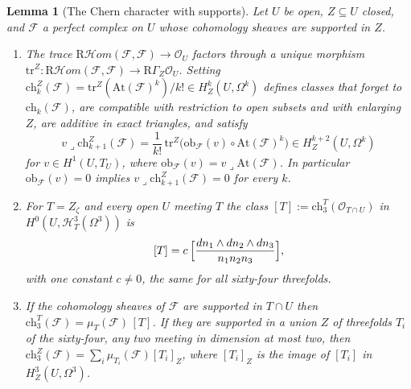 \documentclass[11pt,reqno]{amsart}
\numberwithin{equation}{section}
\theoremstyle{plain}
\newtheorem{lemma}[theorem]{Lemma}
\theoremstyle{definition}
\newcommand{\ch}{\mathrm{ch}}
\begin{document}
\begin{lemma}[The Chern character with supports]\label{lem:chsupport}
Let $U$ be open, $Z\subseteq U$ closed, and $\mathcal{F}$ a perfect complex on $U$ whose cohomology sheaves are supported in $Z$.
\begin{enumerate}
\item[(i)] The trace $\mathrm{R}\mathcal{H}om(\mathcal{F},\mathcal{F})\to\mathcal{O}_{U}$ factors through a unique morphism $\mathrm{tr}^{Z}\colon\mathrm{R}\mathcal{H}om(\mathcal{F},\mathcal{F})\to\mathrm{R}\Gamma_{Z}\mathcal{O}_{U}$. Setting $\ch^{Z}_{k}(\mathcal{F})=\mathrm{tr}^{Z}(\mathrm{At}(\mathcal{F})^{k})/k!\in H^{k}_{Z}(U,\Omega^{k})$ defines classes that forget to $\ch_{k}(\mathcal{F})$, are compatible with restriction to open subsets and with enlarging $Z$, are additive in exact triangles, and satisfy
\[
v\lrcorner\ch^{Z}_{k+1}(\mathcal{F})=\frac{1}{k!}\,\mathrm{tr}^{Z}\bigl(\mathrm{ob}_{\mathcal{F}}(v)\circ\mathrm{At}(\mathcal{F})^{k}\bigr)\in H^{k+2}_{Z}(U,\Omega^{k})
\]
for $v\in H^{1}(U,T_{U})$, where $\mathrm{ob}_{\mathcal{F}}(v)=v\lrcorner\mathrm{At}(\mathcal{F})$. In particular $\mathrm{ob}_{\mathcal{F}}(v)=0$ implies $v\lrcorner\ch^{Z}_{k+1}(\mathcal{F})=0$ for every $k$.
\item[(ii)] For $T=Z_{\zeta}$ and every open $U$ meeting $T$ the class $[T]:=\ch^{T}_{3}(\mathcal{O}_{T\cap U})$ in $H^{0}(U,\mathcal{H}^{3}_{T}(\Omega^{3}))$ is
\[
[T]=c\,\Bigl[\frac{dn_{1}\wedge dn_{2}\wedge dn_{3}}{n_{1}n_{2}n_{3}}\Bigr],
\]
with one constant $c\ne0$, the same for all sixty-four threefolds.
\item[(iii)] If the cohomology sheaves of $\mathcal{F}$ are supported in $T\cap U$ then $\ch^{T}_{3}(\mathcal{F})=\mu_{T}(\mathcal{F})\,[T]$. If they are supported in a union $Z$ of threefolds $T_{i}$ of the sixty-four, any two meeting in dimension at most two, then $\ch^{Z}_{3}(\mathcal{F})=\sum_{i}\mu_{T_{i}}(\mathcal{F})[T_{i}]_{Z}$, where $[T_{i}]_{Z}$ is the image of $[T_{i}]$ in $H^{3}_{Z}(U,\Omega^{3})$.
\end{enumerate}
\end{lemma}
\end{document}
